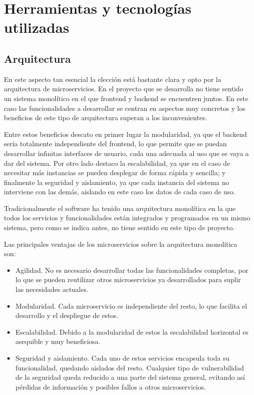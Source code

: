 \chapter{Herramientas y tecnologías utilizadas}

\section{Arquitectura}

En este aspecto tan esencial la elección está bastante clara y opto por la arquitectura de microservicios. En el proyecto que se desarrolla no tiene sentido un sistema monolítico en el que frontend y backend se encuentren juntos. En este caso las funcionalidades a desarrollar se centran en aspectos muy concretos y los beneficios de este tipo de arquitectura superan a los inconvenientes.

Entre estos beneficios descato en primer lugar la modularidad, ya que el backend sería totalmente independiente del frontend, lo que permite que se puedan desarrollar infinitas interfaces de usuario, cada una adecuada al uso que se vaya a dar del sistema. Por otro lado destaco la escalabilidad, ya que en el caso de necesitar más instancias se pueden desplegar de forma rápida y sencilla; y finalmente la seguridad y aislamiento, ya que cada instancia del sistema no interviene con las demás, aislando en este caso los datos de cada caso de uso.

Tradicionalmente el software ha tenido una arquitectura monolítica en la que todos los servicios y funcionalidades están integrados y programados en un mismo sistema, pero como se indica antes, no tiene sentido en este tipo de proyecto.

Las principales ventajas de los microservicios sobre la arquitectura monolítica son:
\begin{itemize}
	\item Agilidad. No es necesario desarrollar todas las funcionalidades completas, por lo que se pueden reutilizar otros microservicios ya desarrollados para suplir las necesidades actuales.
	\item Modularidad. Cada microservicio es independiente del resto, lo que facilita el desarrollo y el despliegue de estos.
	\item Escalabilidad. Debido a la modularidad de estos la escalabilidad horizontal es asequible y muy beneficiosa.
	\item Seguridad y aislamiento. Cada uno de estos servicios encapsula toda su funcionalidad, quedando aislados del resto. Cualquier tipo de vulnerabilidad de la seguridad queda reducido a una parte del sistema general, evitando así pérdidas de información y posibles fallos a otros microservicios.
\end{itemize}

